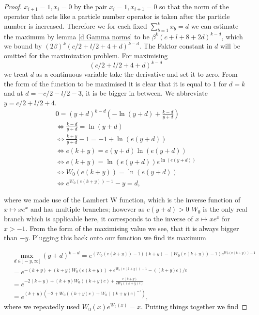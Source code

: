 \documentclass[b5paper,draft,openbib,12pt]{memoir}
\begin{document}
\begin{proof}
\(x_{i+1}=1, x_{i}=0\) by the pair \(x_{i}=1, x_{i+1}=0\) so 
that the norm of the operator that acts like
a particle number operator is taken after the particle number is increased. 
Therefore we for each fixed \(\sum_{b=1}^k x_b=d\)
we can estimate the maximum by lemma \ref{d Gamma norms} 
to be \(\beta^k (c+l+8+2d)^{k-d}\), which we bound 
by
\((2\beta)^k (c/2+l/2+4+d)^{k-d}\).
The Faktor constant in \(d\) will be omitted for the 
maximization problem. For maximising 
\begin{equation}
  (c/2+l/2+4+d)^{k-d}
\end{equation}
we treat \(d\) as a continuous variable take the derivative and set it to zero. From the form of the function to be maximised
it is clear that it is equal to \(1\) for \(d=k\) and at \(d=-c/2-l/2-3\), it is be bigger in between. We abbreviate \(y=c/2+l/2+4\).
\begin{align}
0= (y+d)^{k-d} (-\ln(y+d) + \frac{k-d}{y+d})\\
\iff \frac{k-d}{y+d}= \ln (y+d)\\
\iff \frac{k+y}{y+d}  -1 = -1 + \ln (e (y+d))\\
\iff e(k+y)=e(y+d)\ln(e(y+d))\\
\iff e(k+y)=\ln(e(y+d)) e^{\ln(e(y+d))}\\
\iff W_0(e(k+y))=\ln(e(y+d))\\
\iff e^{W_0(e(k+y))-1}-y=d,
\end{align}

where we made use of the Lambert W function, which 
is the inverse function of \(x\mapsto x e^x\) and has 
multiple branches; however as \(e(y+d)>0\) 
\(W_0\) is the only real branch which is applicable here, it corresponds to the inverse of \(x\mapsto x e^x\) for \(x>-1\). 
From the form of the maximising value we see, that it 
is always bigger than \(-y\). Plugging this back 
onto our function we find its maximum

\begin{align}\nonumber
&\max_{d\in ]-y,\infty[} (y+d)^{k-d}=e^{(W_0(e(k+y))-1) (k+y)- (W_0(e(k+y))-1)e^{W_0(e(k+y))-1}}\\\nonumber
&=e^{-(k+y) + (k+y)W_0(e(k+y)) + e^{W_0(e(k+y))-1} -((k+y)e)/e}\\\nonumber
&=e^{-2(k+y) + (k+y)W_0((k+y)e)+ \frac{e(k+y)}{eW_0((k+y)e)}}\\
&=e^{(k+y)(-2+W_0((k+y)e) + W_0((k+y)e)^{-1})},
\end{align}
where we repeatedly used \(W_0(x)e^{W_0(x)}=x\). Putting things together we find


\end{proof}
\end{document}
